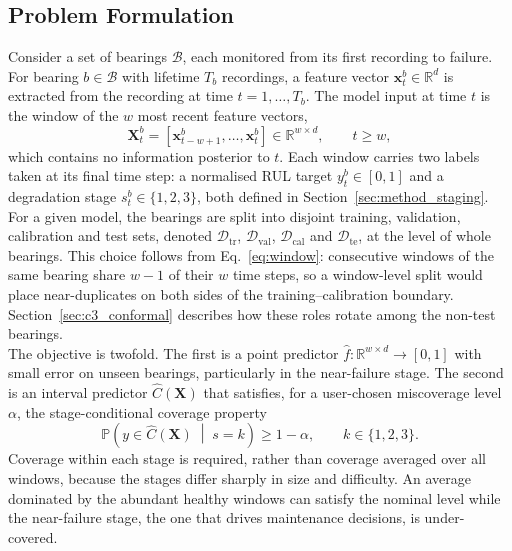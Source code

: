\documentclass[review]{elsarticle}
\begin{document}
\subsection{Problem Formulation}
\label{sec:method_notation}

Consider a set of bearings $\mathcal{B}$, each monitored from its
first recording to failure. For bearing $b \in \mathcal{B}$ with
lifetime $T_b$ recordings, a feature vector
$\mathbf{x}^{b}_{t} \in \mathbb{R}^{d}$ is extracted from the
recording at time $t = 1, \dots, T_b$. The model input at time $t$ is
the window of the $w$ most recent feature vectors,
\begin{equation}
  \mathbf{X}^{b}_{t} =
  \left[\mathbf{x}^{b}_{t-w+1}, \dots, \mathbf{x}^{b}_{t}\right]
  \in \mathbb{R}^{w \times d}, \qquad t \geq w,
  \label{eq:window}
\end{equation}
which contains no information posterior to $t$. Each window carries
two labels taken at its final time step: a normalised RUL target
$y^{b}_{t} \in [0,1]$ and a degradation stage
$s^{b}_{t} \in \{1, 2, 3\}$, both defined in
Section~\ref{sec:method_staging}.\\

For a given model, the bearings are split into disjoint training,
validation, calibration and test sets, denoted
$\mathcal{D}_{\mathrm{tr}}$, $\mathcal{D}_{\mathrm{val}}$,
$\mathcal{D}_{\mathrm{cal}}$ and $\mathcal{D}_{\mathrm{te}}$, at the
level of whole bearings. This choice follows from
Eq.~\eqref{eq:window}: consecutive windows of the same bearing share
$w-1$ of their $w$ time steps, so a window-level split would place
near-duplicates on both sides of the training--calibration boundary.
Section~\ref{sec:c3_conformal} describes how these roles rotate among
the non-test bearings.\\

The objective is twofold. The first is a point predictor
$\hat{f}: \mathbb{R}^{w \times d} \to [0,1]$ with small error on
unseen bearings, particularly in the near-failure stage. The second is
an interval predictor $\hat{C}(\mathbf{X})$ that satisfies, for a
user-chosen miscoverage level $\alpha$, the stage-conditional coverage
property
\begin{equation}
  \mathbb{P}\left( y \in \hat{C}(\mathbf{X}) \;\middle|\; s = k \right)
  \geq 1 - \alpha, \qquad k \in \{1, 2, 3\}.
  \label{eq:coverage_goal}
\end{equation}
Coverage within each stage is required, rather than coverage averaged
over all windows, because the stages differ sharply in size and
difficulty. An average dominated by the abundant healthy windows can
satisfy the nominal level while the near-failure stage, the one that
drives maintenance decisions, is under-covered.
\end{document}
